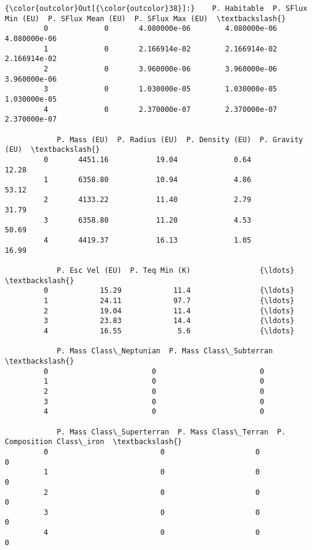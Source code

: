 \documentclass[11pt]{article}
\begin{document}
\begin{Verbatim}[commandchars=\\\{\}]
{\color{outcolor}Out[{\color{outcolor}38}]:}    P. Habitable  P. SFlux Min (EU)  P. SFlux Mean (EU)  P. SFlux Max (EU)  \textbackslash{}
         0             0       4.080000e-06        4.080000e-06       4.080000e-06   
         1             0       2.166914e-02        2.166914e-02       2.166914e-02   
         2             0       3.960000e-06        3.960000e-06       3.960000e-06   
         3             0       1.030000e-05        1.030000e-05       1.030000e-05   
         4             0       2.370000e-07        2.370000e-07       2.370000e-07   
         
            P. Mass (EU)  P. Radius (EU)  P. Density (EU)  P. Gravity (EU)  \textbackslash{}
         0       4451.16           19.04             0.64            12.28   
         1       6358.80           10.94             4.86            53.12   
         2       4133.22           11.40             2.79            31.79   
         3       6358.80           11.20             4.53            50.69   
         4       4419.37           16.13             1.05            16.99   
         
            P. Esc Vel (EU)  P. Teq Min (K)                {\ldots}                  \textbackslash{}
         0            15.29            11.4                {\ldots}                   
         1            24.11            97.7                {\ldots}                   
         2            19.04            11.4                {\ldots}                   
         3            23.83            14.4                {\ldots}                   
         4            16.55             5.6                {\ldots}                   
         
            P. Mass Class\_Neptunian  P. Mass Class\_Subterran  \textbackslash{}
         0                        0                        0   
         1                        0                        0   
         2                        0                        0   
         3                        0                        0   
         4                        0                        0   
         
            P. Mass Class\_Superterran  P. Mass Class\_Terran  P. Composition Class\_iron  \textbackslash{}
         0                          0                     0                          0   
         1                          0                     0                          0   
         2                          0                     0                          0   
         3                          0                     0                          0   
         4                          0                     0                          0   
         

\end{Verbatim}
\end{document}
